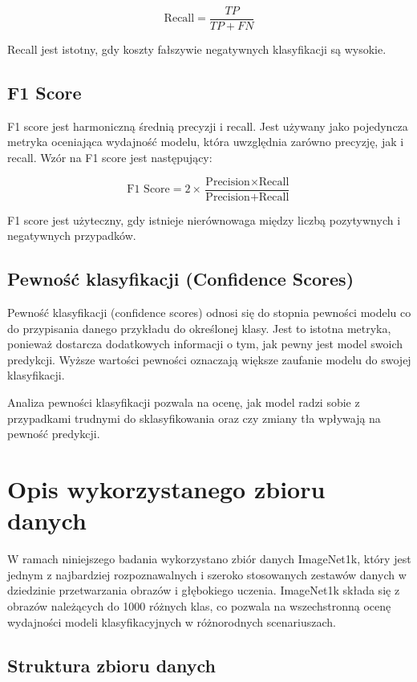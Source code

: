 \[
\text{Recall} = \frac{TP}{TP + FN}
\]

Recall jest istotny, gdy koszty fałszywie negatywnych klasyfikacji są wysokie.

\subsection*{F1 Score}
F1 score jest harmoniczną średnią precyzji i recall. Jest używany jako pojedyncza metryka oceniająca 
wydajność modelu, która uwzględnia zarówno precyzję, jak i recall. Wzór na F1 score jest następujący:

\[
\text{F1 Score} = 2 \times \frac{\text{Precision} \times \text{Recall}}{\text{Precision} + \text{Recall}}
\]

F1 score jest użyteczny, gdy istnieje nierównowaga między liczbą pozytywnych i negatywnych przypadków.

\subsection*{Pewność klasyfikacji (Confidence Scores)}

Pewność klasyfikacji (confidence scores) odnosi się do stopnia pewności modelu co do przypisania danego przykładu do 
określonej klasy. Jest to istotna metryka, ponieważ dostarcza dodatkowych informacji o tym, jak pewny jest model swoich 
predykcji. Wyższe wartości pewności oznaczają większe zaufanie modelu do swojej klasyfikacji.

Analiza pewności klasyfikacji pozwala na ocenę, jak model radzi sobie z przypadkami trudnymi do sklasyfikowania oraz 
czy zmiany tła wpływają na pewność predykcji.

\section*{Opis wykorzystanego zbioru danych}

W ramach niniejszego badania wykorzystano zbiór danych ImageNet1k, który jest jednym z najbardziej rozpoznawalnych i 
szeroko stosowanych zestawów danych w dziedzinie przetwarzania obrazów i głębokiego uczenia. ImageNet1k składa się z 
obrazów należących do 1000 różnych klas, co pozwala na wszechstronną ocenę wydajności modeli klasyfikacyjnych w 
różnorodnych scenariuszach.

\subsection*{Struktura zbioru danych}

